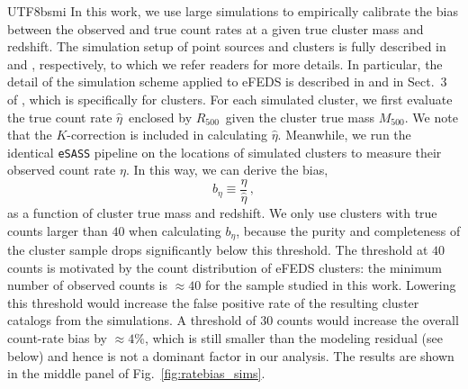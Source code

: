 \documentclass[longauth]{aa}
\newcommand{\Rfiveoo}{\ensuremath{R_{500}}}
\newcommand{\Mfiveoo}{\ensuremath{M_{500}}}
\newcommand{\rate}{\ensuremath{\eta}}
\newcommand{\truerate}{\ensuremath{\hat\eta}}
\newcommand{\brate}{\ensuremath{b_{\eta}}}
\newcommand{\percent}{\ensuremath{\%}}
\begin{document}
\begin{CJK*}{UTF8}{bsmi}
In this work, we use large simulations to empirically calibrate the bias between the observed and true count rates at a given true cluster mass and redshift.
The simulation setup of point sources and clusters is fully described in \cite{comparat19} and \cite{comparat20}, respectively, to which we refer readers for more details.
In particular, the detail of the simulation scheme applied to eFEDS is described in \cite{liuteng21} and in Sect.~3 of \cite{liu21}, which is specifically for clusters.
For each simulated cluster, we first evaluate the true count rate \truerate\ enclosed by \Rfiveoo\  given the cluster true mass \Mfiveoo.
We note that the $K$-correction is included in calculating \truerate.
Meanwhile, we run the identical \texttt{eSASS} pipeline on the locations of simulated clusters to measure their observed count rate \rate.
In this way, we can derive the bias, 
\[
\brate \equiv \frac{\rate}{\truerate} \, , 
\]
as a function of cluster true mass and redshift.
We only use clusters with true counts larger than $40$ when calculating \brate, because the purity and completeness of the cluster sample drops significantly below this threshold.
The threshold at $40$ counts is motivated by the count distribution of eFEDS clusters: the minimum number of observed counts is $\approx40$ for the sample studied in this work.
Lowering this threshold would increase the false positive rate of the resulting cluster catalogs from the simulations.
A threshold of $30$ counts would increase the overall count-rate bias by $\approx4\percent$, which is still smaller than the modeling residual (see below) and hence is not a dominant factor in our analysis.
The results are shown in the middle panel of Fig.~\ref{fig:ratebias_sims}.



\end{CJK*}
\end{document}
